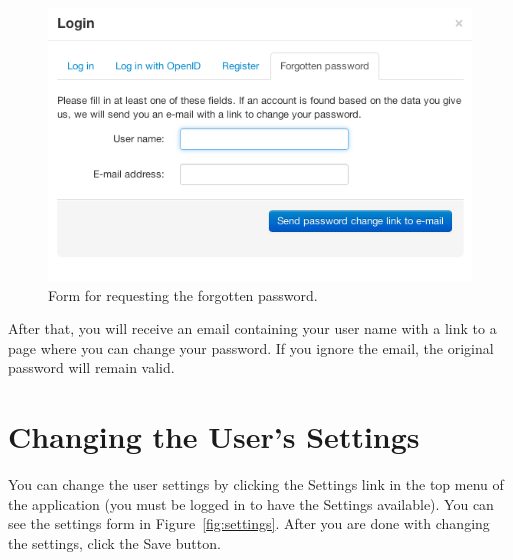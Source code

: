 \begin{figure}[h]
\begin{center}
\includegraphics[scale=0.4]{figures/user_manual/forgotten_password.png}
\end{center}
\caption{Form for requesting the forgotten password.}
\label{fig:forgotten_pass}
\end{figure}

After that, you will receive an email containing your user name with a link to a page where you can change your password. If you ignore the email, the original password will remain valid.

\section{Changing the User's Settings}
\label{sec:settings}

You can change the user settings by clicking the Settings link in the top menu of the application (you must be logged in to have the Settings available). You can see the settings form in Figure~\ref{fig:settings}. After you are done with changing the settings, click the Save button.

